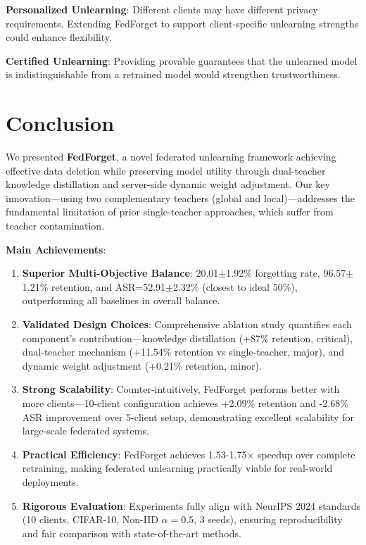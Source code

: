 \documentclass[10pt,twocolumn]{article}
\begin{document}
\textbf{Personalized Unlearning}: Different clients may have different privacy requirements. Extending FedForget to support client-specific unlearning strengths could enhance flexibility.

\textbf{Certified Unlearning}: Providing provable guarantees that the unlearned model is indistinguishable from a retrained model would strengthen trustworthiness.

\section{Conclusion}

We presented \textbf{FedForget}, a novel federated unlearning framework achieving effective data deletion while preserving model utility through dual-teacher knowledge distillation and server-side dynamic weight adjustment. Our key innovation---using two complementary teachers (global and local)---addresses the fundamental limitation of prior single-teacher approaches, which suffer from teacher contamination.

\textbf{Main Achievements}:

\begin{enumerate}
\item \textbf{Superior Multi-Objective Balance}: 20.01$\pm$1.92\% forgetting rate, 96.57$\pm$1.21\% retention, and ASR=52.91$\pm$2.32\% (closest to ideal 50\%), outperforming all baselines in overall balance.
\item \textbf{Validated Design Choices}: Comprehensive ablation study quantifies each component's contribution---knowledge distillation (+87\% retention, critical), dual-teacher mechanism (+11.54\% retention vs single-teacher, major), and dynamic weight adjustment (+0.21\% retention, minor).
\item \textbf{Strong Scalability}: Counter-intuitively, FedForget performs better with more clients---10-client configuration achieves +2.09\% retention and -2.68\% ASR improvement over 5-client setup, demonstrating excellent scalability for large-scale federated systems.
\item \textbf{Practical Efficiency}: FedForget achieves 1.53-1.75$\times$ speedup over complete retraining, making federated unlearning practically viable for real-world deployments.
\item \textbf{Rigorous Evaluation}: Experiments fully align with NeurIPS 2024 standards (10 clients, CIFAR-10, Non-IID $\alpha=0.5$, 3 seeds), ensuring reproducibility and fair comparison with state-of-the-art methods.
\end{enumerate}
\end{document}
